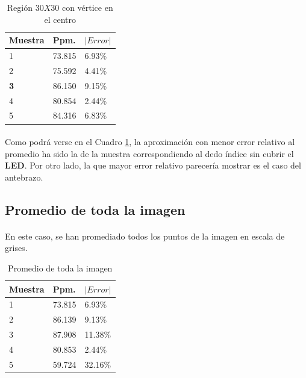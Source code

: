\documentclass[12pt, twocolumn]{article}
\begin{document}
	\begin{table}[H]
		\centering
		\begin{tabular}{@{}lll@{}}
			\toprule
			Muestra & Ppm.   & $|Error|$  \\ \midrule
			1    & 73.815 & 6.93\% \\
			2    & 75.592 & 4.41\% \\
			\textbf{3}    & 86.150 & 9.15\% \\
			4    & 80.854 & 2.44\% \\
			5    & 84.316 & 6.83\% \\ \bottomrule
		\end{tabular}
		\caption{Región $30X30$ con vértice en el centro}
		\label{3030}
	\end{table}
	
	\paragraph{} Como podrá verse en el Cuadro \ref{3030}, la aproximación con menor error relativo al promedio ha sido la de la muestra correspondiendo al dedo índice sin cubrir el \textbf{LED}. Por otro lado, la que mayor error relativo parecería mostrar es el caso del antebrazo.
	
	\subsection{Promedio de toda la imagen}
	
	\paragraph{} En este caso, se han promediado todos los puntos de la imagen en escala de grises.
	
	\begin{table}[H]
		\centering
		\label{my-label}
		\begin{tabular}{@{}lll@{}}
			\toprule
			Muestra & Ppm.   &  $|Error|$    \\ \midrule
			1    & 73.815 & 6.93\%  \\
			2    & 86.139 & 9.13\%  \\
			3    & 87.908 & 11.38\% \\
			4    & 80.853 & 2.44\%  \\
			5    & 59.724 & 32.16\% \\ \bottomrule
		\end{tabular}
		\caption{Promedio de toda la imagen}
		\label{prom}
	\end{table}
	
\end{document}
